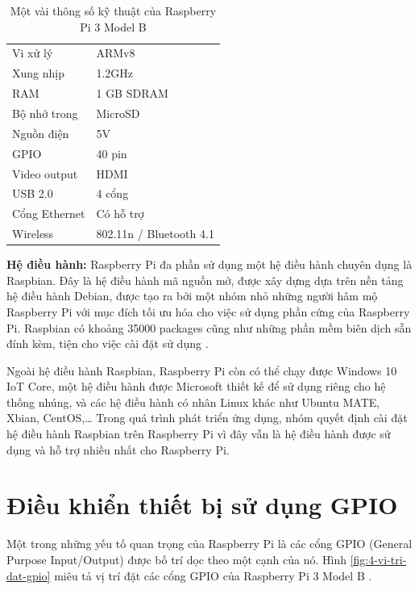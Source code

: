 \documentclass[12pt,a4paper,oneside]{extbook}
\begin{document}
\begin{table}
\centering
\caption{Một vài thông số kỹ thuật của Raspberry Pi 3 Model B}\label{tab:pi-3-model-b-specs}
\begin{tabular}{ |l|l| } 
 \hline
	Vi xử lý		&	ARMv8\\
	Xung nhịp		&	1.2GHz\\
	RAM				&	1 GB SDRAM\\
	Bộ nhớ trong	&	MicroSD\\
	Nguồn điện		&	5V\\
	GPIO			&	40 pin\\
	Video output	&	HDMI\\
	USB 2.0			&	4 cổng\\
	Cổng Ethernet	&	Có hỗ trợ\\
	Wireless		&	802.11n / Bluetooth 4.1\\
 \hline
\end{tabular}
\end{table}

\textbf{Hệ điều hành:} Raspberry Pi đa phần sử dụng một hệ điều hành chuyên dụng là Raspbian. Đây là hệ điều hành mã nguồn mở, được xây dựng dựa trên nền tảng hệ điều hành Debian, được tạo ra bởi một nhóm nhỏ những người hâm mộ Raspberry Pi với mục đích tối ưu hóa cho việc sử dụng phần cứng của Raspberry Pi. Raspbian có khoảng 35000 packages cũng như những phần mềm biên dịch sẵn đính kèm, tiện cho việc cài đặt sử dụng \cite{pi-wiki}\cite{raspbian-front-page}.

Ngoài hệ điều hành Raspbian, Raspberry Pi còn có thể chạy được Windows 10 IoT Core, một hệ điều hành được Microsoft thiết kế để sử dụng riêng cho hệ thống nhúng, và các hệ điều hành có nhân Linux khác như Ubuntu MATE, Xbian, CentOS,\dots\hspace{0mm} Trong quá trình phát triển ứng dụng, nhóm quyết định cài đặt hệ điều hành Raspbian trên Raspberry Pi vì đây vẫn là hệ điều hành được sử dụng và hỗ trợ nhiều nhất cho Raspberry Pi.

\section{Điều khiển thiết bị sử dụng GPIO}
Một trong những yếu tố quan trọng của Raspberry Pi là các cổng GPIO (General Purpose Input/Output) được bố trí dọc theo một cạnh của nó. Hình \ref{fig:4-vi-tri-dat-gpio} miêu tả vị trí đặt các cổng GPIO của Raspberry Pi 3 Model B \cite{raspberry-gpio}.
\end{document}
